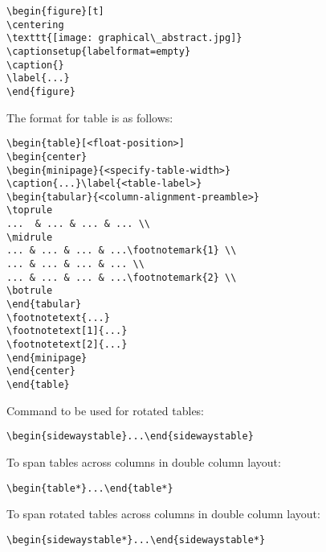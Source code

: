 \documentclass{article}
\begin{document}
\begin{verbatim}
\begin{figure}[t]
\centering
\texttt{[image: graphical\_abstract.jpg]}
\captionsetup{labelformat=empty}
\caption{}
\label{...}
\end{figure}
\end{verbatim}

The format for table is as follows:

\begin{verbatim}
\begin{table}[<float-position>]
\begin{center}
\begin{minipage}{<specify-table-width>}
\caption{...}\label{<table-label>}
\begin{tabular}{<column-alignment-preamble>}
\toprule
...  & ... & ... & ... \\
\midrule
... & ... & ... & ...\footnotemark{1} \\
... & ... & ... & ... \\
... & ... & ... & ...\footnotemark{2} \\
\botrule
\end{tabular}
\footnotetext{...}
\footnotetext[1]{...}
\footnotetext[2]{...}
\end{minipage}
\end{center}
\end{table}
\end{verbatim}

Command to be used for rotated tables:

\begin{verbatim}
\begin{sidewaystable}...\end{sidewaystable}
\end{verbatim}

To span tables across columns in double column layout:

\begin{verbatim}
\begin{table*}...\end{table*}
\end{verbatim}

To span rotated tables across columns in double column layout:

\begin{verbatim}
\begin{sidewaystable*}...\end{sidewaystable*}
\end{verbatim}
\end{document}
